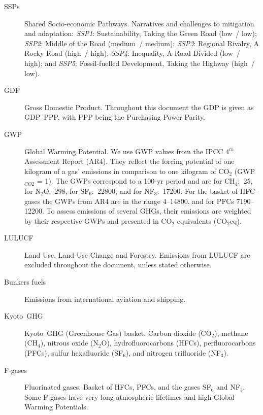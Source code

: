 \documentclass[12pt]{article}
\begin{document}
 \begin{description}
 \item [SSPs] Shared Socio-economic Pathways. \newline
 Narratives and challenges to mitigation and adaptation: \newline
 \textit{SSP1}: Sustainability, Taking the Green Road (low~/ low); \newline
 \textit{SSP2}: Middle of the Road (medium~/ medium); \newline
 \textit{SSP3}: Regional Rivalry, A Rocky Road (high~/ high); \newline
 \textit{SSP4}: Inequality, A Road Divided (low~/ high); and \newline
 \textit{SSP5}: Fossil-fuelled Development, Taking the Highway (high~/ low).
 \item [GDP] Gross Domestic Product. \newline
 Throughout this document the GDP is given as GDP~PPP, with PPP being the Purchasing Power Parity.
 \item [GWP] Global Warming Potential. \newline
 We use GWP values from the IPCC 4$^{th}$ Assessment Report (AR4). 
 They reflect the forcing potential of one kilogram of a gas' emissions in comparison to one kilogram of CO$_2$ (GWP$_{CO2}$ = 1). 
 The GWPs correspond to a 100-yr period and are for CH$_4$:~25, for N$_2$O:~298, for SF$_6$:~22800, and for NF$_3$:~17200. 
 For the basket of HFC-gases the GWPs from AR4 are in the range 4--14800, and for PFCs 7190--12200. 
 To assess emissions of several GHGs, their emissions are weighted by their respective GWPs and presented in CO$_2$ equivalents (CO$_2$eq).
 \item [LULUCF] Land Use, Land-Use Change and Forestry. \newline
 Emissions from LULUCF are excluded throughout the document, unless stated otherwise.
 \item [Bunkers fuels] Emissions from international aviation and shipping.
 \item [Kyoto~GHG] Kyoto~GHG (Greenhouse Gas) basket. \newline
 Carbon dioxide (CO$_2$), methane (CH$_4$), nitrous oxide (N$_2$O), hydrofluorocarbons (HFCs), perfluorocarbons (PFCs), sulfur hexafluoride (SF$_6$), and nitrogen trifluoride (NF$_3$).
 \item [F-gases] Fluorinated gases. \newline
 Basket of HFCs, PFCs, and the gases SF$_6$ and NF$_3$. 
 Some F-gases have very long atmospheric lifetimes and high Global Warming Potentials.

\end{description}
\end{document}
